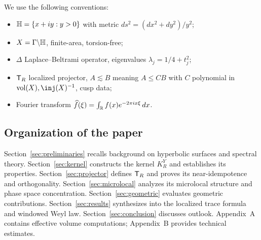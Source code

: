 We use the following conventions:
\begin{itemize}
  \item $\mathbb{H} = \{x+iy:y>0\}$ with metric $ds^2 = (dx^2+dy^2)/y^2$;
  \item $X=\Gamma\backslash \mathbb{H}$, finite-area, torsion-free;
  \item $\Delta$ Laplace--Beltrami operator, eigenvalues $\lambda_j=1/4+t_j^2$;
  \item $\mathsf{T}_R$ localized projector, $A\lesssim B$ meaning $A \le CB$ with $C$ polynomial in $\vol(X),\inj(X)^{-1}$, cusp data;
  \item Fourier transform $\widehat{f}(\xi)=\int_{\mathbb{R}} f(x) e^{-2\pi i x\xi}\,dx$.
\end{itemize}

\subsection{Organization of the paper}\label{subsec:outline}

Section~\ref{sec:preliminaries} recalls background on hyperbolic surfaces and spectral theory.  
Section~\ref{sec:kernel} constructs the kernel $K_R^Y$ and establishes its properties.  
Section~\ref{sec:projector} defines $\mathsf{T}_R$ and proves its near-idempotence and orthogonality.  
Section~\ref{sec:microlocal} analyzes its microlocal structure and phase space concentration.  
Section~\ref{sec:geometric} evaluates geometric contributions.  
Section~\ref{sec:results} synthesizes into the localized trace formula and windowed Weyl law.  
Section~\ref{sec:conclusion} discusses outlook.  
Appendix~A contains effective volume computations; Appendix~B provides technical estimates.

